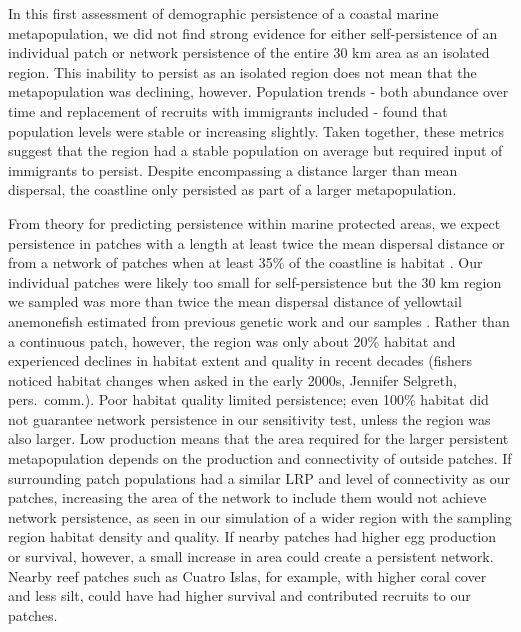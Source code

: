 \documentclass[12pt, oneside]{article}   	%
\begin{document}
In this first assessment of demographic persistence of a coastal marine metapopulation, we did not find strong evidence for either self-persistence of an individual patch or network persistence of the entire 30 km area as an isolated region. This inability to persist as an isolated region does not mean that the metapopulation was declining, however. Population trends - both abundance over time and replacement of recruits with immigrants included - found that population levels were stable or increasing slightly. Taken together, these metrics suggest that the region had a stable population on average but required input of immigrants to persist. Despite encompassing a distance larger than mean dispersal, the coastline only persisted as part of a larger metapopulation.

From theory for predicting persistence within marine protected areas, we expect persistence in patches with a length at least twice the mean dispersal distance \citep[e.g.][]{lockwood2002effects} or from a network of patches when at least 35\% of the coastline is habitat \citep{botsford2001dependence}. Our individual patches were likely too small for self-persistence but the 30 km region we sampled was more than twice the mean dispersal distance of yellowtail anemonefish estimated from previous genetic work \citep[9 km,][]{pinsky2010using} and our samples \citep[8.2 km,][]{catalanoInPrepconnectivity}. Rather than a continuous patch, however, the region was only about 20\% habitat and experienced declines in habitat extent and quality in recent decades (fishers noticed habitat changes when asked in the early 2000s, Jennifer Selgreth, pers.\ comm.). Poor habitat quality limited persistence; even 100\% habitat did not guarantee network persistence in our sensitivity test, unless the region was also larger. Low production means that the area required for the larger persistent metapopulation \cite[like][estimated in their system]{johnson2018integrating} depends on the production and connectivity of outside patches. If surrounding patch populations had a similar LRP and level of connectivity as our patches, increasing the area of the network to include them would not achieve network persistence, as seen in our simulation of a wider region with the sampling region habitat density and quality. If nearby patches had higher egg production or survival, however, a small increase in area could create a persistent network. Nearby reef patches such as Cuatro Islas, for example, with higher coral cover and less silt, could have had higher survival and contributed recruits to our patches. 
\end{document}
